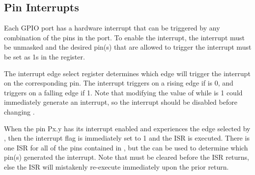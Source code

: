 \subsection{Pin Interrupts}

Each GPIO port has a hardware interrupt that can be triggered by any combination of the pins in the port. To enable the interrupt, the  interrupt must be unmasked and the desired pin(s) that are allowed to trigger the interrupt must be set as 1s in the  register.

The interrupt edge select register  determines which edge will trigger the interrupt on the corresponding pin. The interrupt triggers on a rising edge if  is 0, and triggers on a falling edge if 1. Note that modifying the value of  while  is 1 could immediately generate an interrupt, so the interrupt should be disabled before changing .

When the pin Px.y has its interrupt enabled and experiences the edge selected by , then the interrupt flag  is immediately set to 1 and the  ISR is executed. There is one ISR for all of the pins contained in , but the  can be used to determine which pin(s) generated the interrupt. Note that  must be cleared before the ISR returns, else the ISR will mistakenly re-execute immediately upon the prior return.
